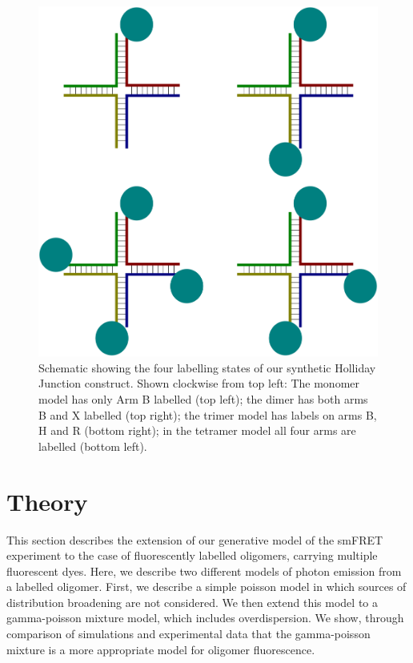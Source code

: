 \begin{figure}
   \begin{center}
      \includegraphics*[clip=true, width=6in]{sizing/holliday_junction_labelling.pdf}
      \caption{Schematic showing the four labelling states of our synthetic Holliday Junction construct. Shown clockwise from top left: The monomer model has only Arm B labelled (top left); the dimer has both arms B and X labelled (top right); the trimer model has labels on arms B, H and R (bottom right); in the tetramer model all four arms are labelled (bottom left).}
      \label{fig:holliday_junction_labelling}
   \end{center}
\end{figure}

\section{Theory}

This section describes the extension of our generative model of the smFRET experiment to the case of fluorescently labelled oligomers, carrying multiple fluorescent dyes. Here, we describe two different models of photon emission from a labelled oligomer. First, we describe a simple poisson model in which sources of distribution broadening are not considered. We then extend this model to a gamma-poisson mixture model, which includes overdispersion. We show, through comparison of simulations and experimental data that the gamma-poisson mixture is a more appropriate model for oligomer fluorescence.

